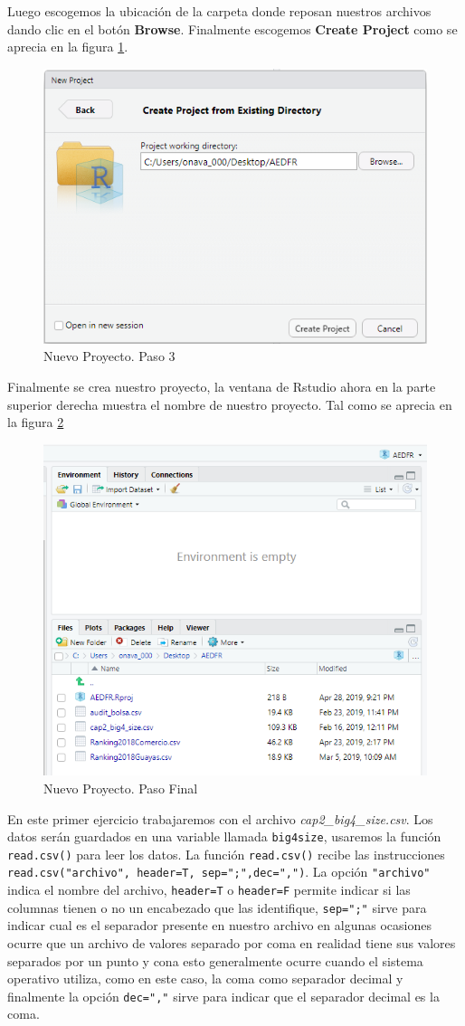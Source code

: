 \documentclass[letterpaper,]{book}
\begin{document}
Luego escogemos la ubicación de la carpeta donde reposan nuestros archivos dando clic en el botón \textbf{Browse}. Finalmente escogemos \textbf{Create Project} como se aprecia en la figura \ref{fig:project3}.

\begin{figure}[!h]

{\centering \includegraphics[width=0.45\linewidth]{project3} 

}

\caption{Nuevo Proyecto. Paso 3}\label{fig:project3}
\end{figure}

Finalmente se crea nuestro proyecto, la ventana de Rstudio ahora en la parte superior derecha muestra el nombre de nuestro proyecto. Tal como se aprecia en la figura \ref{fig:project4}

\begin{figure}[!h]

{\centering \includegraphics[width=0.4\linewidth]{project4} 

}

\caption{Nuevo Proyecto. Paso Final}\label{fig:project4}
\end{figure}

\newpage

En este primer ejercicio trabajaremos con el archivo \emph{cap2\_big4\_size.csv}. Los datos serán guardados en una variable llamada \texttt{big4size}, usaremos la función \texttt{read.csv()} para leer los datos. La función \texttt{read.csv()} recibe las instrucciones \texttt{read.csv("archivo",\ header=T,\ sep=";",dec=",")}. La opción \texttt{"archivo"} indica el nombre del archivo, \texttt{header=T} o \texttt{header=F} permite indicar si las columnas tienen o no un encabezado que las identifique, \texttt{sep=";"} sirve para indicar cual es el separador presente en nuestro archivo en algunas ocasiones ocurre que un archivo de valores separado por coma en realidad tiene sus valores separados por un punto y cona esto generalmente ocurre cuando el sistema operativo utiliza, como en este caso, la coma como separador decimal y finalmente la opción \texttt{dec=","} sirve para indicar que el separador decimal es la coma.
\end{document}
